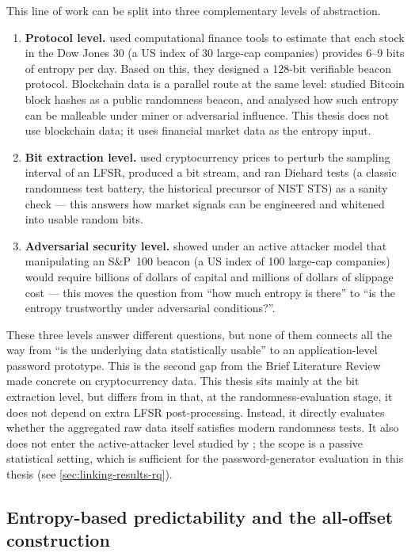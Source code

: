 \documentclass[11pt,titlepage,openany,oneside]{book}  %
\begin{document}
This line of work can be split into three complementary levels of abstraction.
\begin{enumerate}
\item \textbf{Protocol level.} \citet{clark2010beacon} used computational finance tools to estimate that each stock in the Dow Jones 30 (a US index of 30 large-cap companies) provides 6--9 bits of entropy per day. Based on this, they designed a 128-bit verifiable beacon protocol. Blockchain data is a parallel route at the same level: \citet{bonneau2015bitcoin} studied Bitcoin block hashes as a public randomness beacon, and \citet{pierrot2018malleability} analysed how such entropy can be malleable under miner or adversarial influence. This thesis does not use blockchain data; it uses financial market data as the entropy input.
\item \textbf{Bit extraction level.} \citet{chiba2024lfsr} used cryptocurrency prices to perturb the sampling interval of an LFSR, produced a bit stream, and ran Diehard tests (a classic randomness test battery, the historical precursor of NIST STS) as a sanity check --- this answers how market signals can be engineered and whitened into usable random bits.
\item \textbf{Adversarial security level.} \citet{landis2025beacon} showed under an active attacker model that manipulating an S\&P~100 beacon (a US index of 100 large-cap companies) would require billions of dollars of capital and millions of dollars of slippage cost --- this moves the question from ``how much entropy is there'' to ``is the entropy trustworthy under adversarial conditions?''.
\end{enumerate}

These three levels answer different questions, but none of them connects all the way from ``is the underlying data statistically usable'' to an application-level password prototype. This is the second gap from the Brief Literature Review made concrete on cryptocurrency data. This thesis sits mainly at the bit extraction level, but differs from \citet{chiba2024lfsr} in that, at the randomness-evaluation stage, it does not depend on extra LFSR post-processing. Instead, it directly evaluates whether the aggregated raw data itself satisfies modern randomness tests. It also does not enter the active-attacker level studied by \citet{landis2025beacon}; the scope is a passive statistical setting, which is sufficient for the password-generator evaluation in this thesis (see \cref{sec:linking-results-rq}).

\subsection*{Entropy-based predictability and the all-offset construction}
\end{document}
